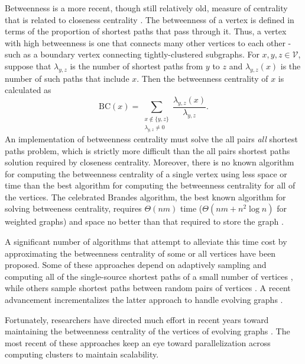 \documentclass{report}
\begin{document}
Betweenness is a more recent, though still relatively old, measure of centrality that is related to closeness centrality \cite{freeman1977set}. 
The betweenness of a vertex is defined in terms of the proportion of shortest paths that pass through it.
Thus, a vertex with high betweenness is one that connects many other vertices to each other - such as a boundary vertex connecting tightly-clustered subgraphs.
For $x,y, z \in \mathcal{V}$, suppose that $\lambda_{y,z}$ is the number of shortest paths from $y$ to $z$ and $\lambda_{y,z}(x)$ is the number of such paths that include $x$. 
Then the betweenness centrality of $x$ is calculated as
%
\begin{equation} \label{eq:bc}
\textrm{BC}(x) = \sum\limits_{\substack{x \not\in \{y,z\} \\ \lambda_{y,z} \neq 0}} \frac{\lambda_{y,z}(x)}{\lambda_{y,z}}.
\end{equation}
%
An implementation of betweenness centrality must solve the all pairs \emph{all} shortest paths problem, which is strictly more difficult than the all pairs shortest paths solution required by closeness centrality.
Moreover, there is no known algorithm for computing the betweenness centrality of a single vertex using less space or time than the best algorithm for computing the betweenness centrality for all of the vertices. 
The celebrated Brandes algorithm, the best known algorithm for solving betweeness centrality, requires $\Theta(nm)$ time ($\Theta(nm + n^2\log n)$ for weighted graphs) and space no better than that required to store the graph  \cite{brandes2001faster}. 

A significant number of algorithms that attempt to alleviate this time cost by approximating the betweenness centrality of some or all vertices have been proposed. 
Some of these approaches depend on adaptively sampling and computing all of the single-source shortest paths of a small number of vertices \cite{bader2007approximating,brandes2007centrality}, while others sample shortest paths between random pairs of vertices \cite{riondato2016fast}. 
A recent advancement incrementalizes the latter approach to handle evolving graphs \cite{bergamini2014approximating}.

Fortunately, researchers have directed much effort in recent years toward maintaining the betweenness centrality of the vertices of evolving graphs \cite{green2012fast, wei2014real, kourtellis2015scalable}. 
The most recent of these approaches keep an eye toward parallelization across computing clusters to maintain scalability.
\end{document}
